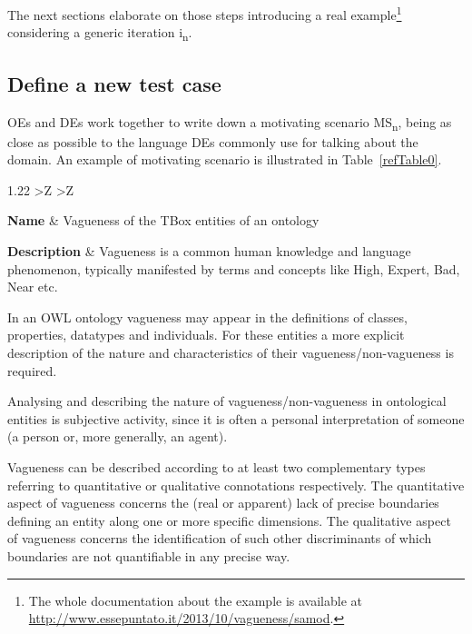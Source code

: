 \documentclass[runningheads,a4paper]{llncs}
\begin{document}
The next sections elaborate on those steps introducing a real example\footnote{The whole documentation about the example is available at \url{http://www.essepuntato.it/2013/10/vagueness/samod}. } considering a generic iteration i\textsubscript{n}.

\subsection{Define a new test case}

OEs and DEs work together to write down a motivating scenario MS\textsubscript{n}, being as close as possible to the language DEs commonly use for talking about the domain. An example of motivating scenario is illustrated in Table~\ref{refTable0}.
\begin{table}[h!]
\centering

\cprotect\caption{An example of motivating scenario.}
\renewcommand{\tabularxcolumn}[1]{>{\arraybackslash}m{#1}}

\scalebox{0.8} {\begin{tabularx}{1.22\textwidth}{ >{\hsize}Z  >{\hsize}Z }
\toprule

{\bf Name} & Vagueness of the TBox entities of an ontology \\
 \midrule

{\bf Description} & Vagueness is a common human knowledge and language phenomenon, typically manifested by terms and concepts like High, Expert, Bad, Near etc.

In an OWL ontology vagueness may appear in the definitions of classes, properties, datatypes and individuals. For these entities a more explicit description of the nature and characteristics of their vagueness/non-vagueness is required.

Analysing and describing the nature of vagueness/non-vagueness in ontological entities is subjective activity, since it is often a personal interpretation of someone (a person or, more generally, an agent).

Vagueness can be described according to at least two complementary types referring to quantitative or qualitative connotations respectively. The quantitative aspect of vagueness concerns the (real or apparent) lack of precise boundaries defining an entity along one or more specific dimensions. The qualitative aspect of vagueness concerns the identification of such other discriminants of which boundaries are not quantifiable in any precise way.


\end{tabularx}}
\end{table}
\end{document}

